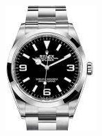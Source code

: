 \begin{multicols}{4}

\begin{figure}[H]
  \centering
  \includegraphics[width=\linewidth]{6x8-temps/rolex.jpeg}
\end{figure}


\end{multicols}
